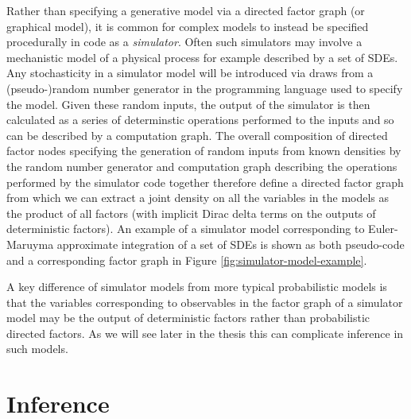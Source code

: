 Rather than specifying a generative model via a directed factor graph (or graphical model), it is common for complex models to instead be specified procedurally in code as a \emph{simulator}. Often such simulators may involve a mechanistic model of a physical process for example described by a set of \acfp{SDE}. Any stochasticity in a simulator model will be introduced via draws from a (pseudo-)random number generator in the programming language used to specify the model. Given these random inputs, the output of the simulator is then calculated as a series of determinstic operations performed to the inputs and so can be described by a computation graph. The overall composition of directed factor nodes specifying the generation of random inputs from known densities by the random number generator and computation graph describing the operations performed by the simulator code together therefore define a directed factor graph from which we can extract a joint density on all the variables in the models as the product of all factors (with implicit Dirac delta terms on the outputs of deterministic factors).  An example of a simulator model corresponding to Euler-Maruyma approximate integration of a set of \acp{SDE} is shown as both pseudo-code and a corresponding factor graph in Figure \ref{fig:simulator-model-example}.

A key difference of simulator models from more typical probabilistic models is that the variables corresponding to observables in the factor graph of a simulator model may be the output of deterministic factors rather than probabilistic directed factors. As we will see later in the thesis this can complicate inference in such models. 


\section{Inference}

